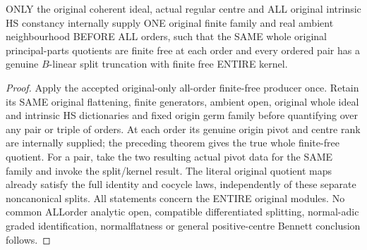 \begin{theorem}
\label{hir:actual-hs-constant-centre-whole-split-order-system}
ONLY the original coherent ideal, actual regular centre and ALL original
intrinsic HS constancy internally supply ONE original finite family
and real ambient neighbourhood BEFORE ALL orders, such that the SAME
whole original principal-parts quotients are finite free at each order
and every ordered pair has a genuine $B$-linear split truncation with
finite free ENTIRE kernel.
\leanok
\end{theorem}
\begin{proof}
Apply the accepted original-only all-order finite-free producer once.
Retain its SAME original flattening, finite generators, ambient open,
original whole ideal and intrinsic HS dictionaries and fixed origin
germ family before quantifying over any pair or triple of orders.
At each order its genuine origin pivot and centre rank are internally
supplied; the preceding theorem gives the true whole finite-free
quotient. For a pair, take the two resulting actual pivot data for the
SAME family and invoke the split/kernel result. The literal original
quotient maps already satisfy the full identity and cocycle laws,
independently of these separate noncanonical splits. All statements
concern the ENTIRE original modules. No common ALLorder analytic open,
compatible differentiated splitting, normal-adic graded identification,
normalflatness or general positive-centre Bennett conclusion follows.
\end{proof}
